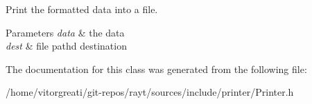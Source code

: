 Print the formatted data into a file. 


\begin{DoxyParams}{Parameters}
{\em data} & the data \\
\hline
{\em dest} & file pathd destination \\
\hline
\end{DoxyParams}


The documentation for this class was generated from the following file\+:\begin{DoxyCompactItemize}
\item 
/home/vitorgreati/git-\/repos/rayt/sources/include/printer/Printer.\+h\end{DoxyCompactItemize}
